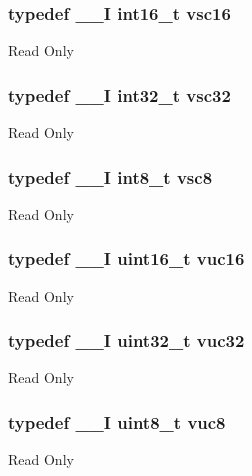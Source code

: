 \subsubsection[{\texorpdfstring{vsc16}{vsc16}}]{\setlength{\rightskip}{0pt plus 5cm}typedef {\bf \+\_\+\+\_\+I} int16\+\_\+t {\bf vsc16}}\hypertarget{group___exported__types_ga369ae0177b957e5afa7c1e62312f97c3}{}\label{group___exported__types_ga369ae0177b957e5afa7c1e62312f97c3}
Read Only 
\subsubsection[{\texorpdfstring{vsc32}{vsc32}}]{\setlength{\rightskip}{0pt plus 5cm}typedef {\bf \+\_\+\+\_\+I} int32\+\_\+t {\bf vsc32}}\hypertarget{group___exported__types_gaec1d22666cf030b79051e5daa372fbc8}{}\label{group___exported__types_gaec1d22666cf030b79051e5daa372fbc8}
Read Only 
\subsubsection[{\texorpdfstring{vsc8}{vsc8}}]{\setlength{\rightskip}{0pt plus 5cm}typedef {\bf \+\_\+\+\_\+I} int8\+\_\+t {\bf vsc8}}\hypertarget{group___exported__types_ga47463bcded079ac61d5da46aff497803}{}\label{group___exported__types_ga47463bcded079ac61d5da46aff497803}
Read Only 
\subsubsection[{\texorpdfstring{vuc16}{vuc16}}]{\setlength{\rightskip}{0pt plus 5cm}typedef {\bf \+\_\+\+\_\+I} uint16\+\_\+t {\bf vuc16}}\hypertarget{group___exported__types_ga7f6037565f0caa27727c8b871daf0d56}{}\label{group___exported__types_ga7f6037565f0caa27727c8b871daf0d56}
Read Only 
\subsubsection[{\texorpdfstring{vuc32}{vuc32}}]{\setlength{\rightskip}{0pt plus 5cm}typedef {\bf \+\_\+\+\_\+I} uint32\+\_\+t {\bf vuc32}}\hypertarget{group___exported__types_ga2e08e321a35a55e72c5b3a507e76371f}{}\label{group___exported__types_ga2e08e321a35a55e72c5b3a507e76371f}
Read Only 
\subsubsection[{\texorpdfstring{vuc8}{vuc8}}]{\setlength{\rightskip}{0pt plus 5cm}typedef {\bf \+\_\+\+\_\+I} uint8\+\_\+t {\bf vuc8}}\hypertarget{group___exported__types_gab0ec90ac9b2c5864755998c8d37c264a}{}\label{group___exported__types_gab0ec90ac9b2c5864755998c8d37c264a}
Read Only 